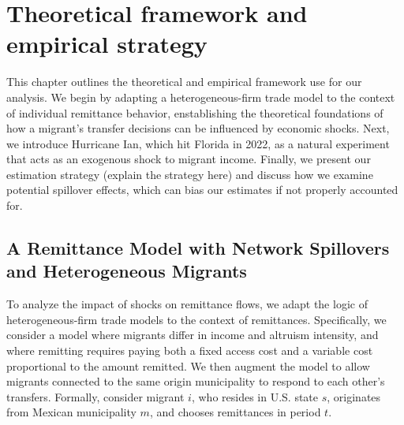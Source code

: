 \chapter{Theoretical framework and empirical strategy}

This chapter outlines the theoretical and empirical framework use for our analysis. We begin by adapting a heterogeneous-firm trade model to the context of individual remittance behavior, enstablishing the theoretical foundations of how a migrant's transfer decisions can be influenced by economic shocks. Next, we introduce Hurricane Ian, which hit Florida in 2022, as a natural experiment that acts as an exogenous shock to migrant income. Finally, we present our estimation strategy (explain the strategy here) and discuss how we examine potential spillover effects, which can bias our estimates if not properly accounted for.

\section{A Remittance Model with Network Spillovers and Heterogeneous Migrants}

To analyze the impact of shocks on remittance flows, we adapt the logic of heterogeneous-firm trade models to the context of remittances. Specifically, we consider a model where migrants differ in income and altruism intensity, and where remitting requires paying both a fixed access cost and a variable cost proportional to the amount remitted. We then augment the model to allow migrants connected to the same origin municipality to respond to each other's transfers. Formally, consider migrant $i$, who resides in U.S. state $s$, originates from Mexican municipality $m$, and chooses remittances in period $t$.

